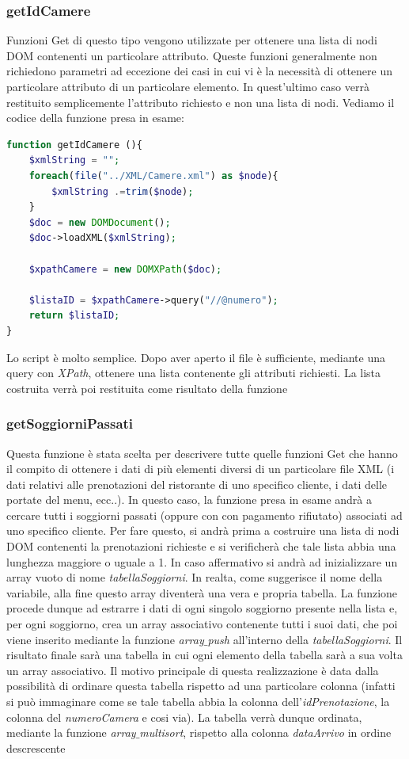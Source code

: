 \documentclass [a4paper, 12pt]{book}
\begin{document}
\subsubsection{getIdCamere}
Funzioni Get di questo tipo vengono utilizzate per ottenere una lista di nodi DOM contenenti un particolare attributo. Queste funzioni generalmente non richiedono parametri ad eccezione dei casi in cui vi è la necessità di ottenere un particolare attributo di un particolare elemento. In quest'ultimo caso verrà restituito semplicemente l'attributo richiesto e non una lista di nodi. Vediamo il codice della funzione presa in esame:
\begin{lstlisting}[style=XML , language=PHP]
function getIdCamere (){
    $xmlString = "";
    foreach(file("../XML/Camere.xml") as $node){
        $xmlString .=trim($node);
    }
    $doc = new DOMDocument();
    $doc->loadXML($xmlString);

    $xpathCamere = new DOMXPath($doc);

    $listaID = $xpathCamere->query("//@numero");
    return $listaID;
}
\end{lstlisting}
Lo script è molto semplice. Dopo aver aperto il file è sufficiente, mediante una query con \textit{XPath}, ottenere una lista contenente gli attributi richiesti. La lista costruita verrà poi restituita come risultato della funzione


\subsubsection{getSoggiorniPassati}
Questa funzione è stata scelta per descrivere tutte quelle funzioni Get che hanno il compito di ottenere i dati di più elementi diversi di un particolare file XML (i dati relativi alle prenotazioni del ristorante di uno specifico cliente, i dati delle portate del menu, ecc..). In questo caso, la funzione presa in esame andrà a cercare tutti i soggiorni passati (oppure con con pagamento rifiutato) associati ad uno specifico cliente. Per fare questo, si andrà prima a costruire una lista di nodi DOM contenenti la prenotazioni richieste e si verificherà che tale lista abbia una lunghezza maggiore o uguale a 1. In caso affermativo si andrà ad inizializzare un array vuoto di nome \textit{tabellaSoggiorni}. In realta, come suggerisce il nome della variabile, alla fine questo array diventerà una vera e propria tabella. La funzione procede dunque ad estrarre i dati di ogni singolo soggiorno presente nella lista e, per ogni soggiorno, crea un array associativo contenente tutti i suoi dati, che poi viene inserito mediante la funzione \textit{array$\_$push} all'interno della \textit{tabellaSoggiorni}. Il risultato finale sarà una tabella in cui ogni elemento della tabella sarà a sua volta un array associativo. Il motivo principale di questa realizzazione è data dalla possibilità di ordinare questa tabella rispetto ad una particolare colonna (infatti si può immaginare come se tale tabella abbia la colonna dell'\textit{idPrenotazione}, la colonna del \textit{numeroCamera} e cosi via). La tabella verrà dunque ordinata, mediante la funzione \textit{array$\_$multisort}, rispetto alla colonna \textit{dataArrivo} in ordine descrescente
\end{document}
